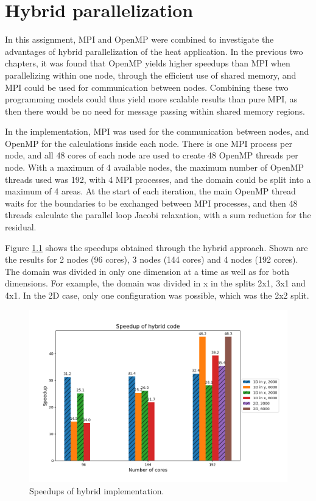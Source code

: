 \chapter{Hybrid parallelization}


In this assignment, MPI and OpenMP were combined to investigate the advantages of hybrid parallelization of the heat application. In the previous two chapters, it was found that OpenMP yields higher speedups than MPI when parallelizing within one node, through the efficient use of shared memory, and MPI could be used for communication between nodes. Combining these two programming models could thus yield more scalable results than pure MPI, as then there would be no need for message passing within shared memory regions.

In the implementation, MPI was used for the communication between nodes, and OpenMP for the calculations inside each node. There is one MPI process per node, and all 48 cores of each node are used to create 48 OpenMP threads per node. With a maximum of 4 available nodes, the maximum number of OpenMP threads used was 192, with 4 MPI processes, and the domain could be split into a maximum of 4 areas. At the start of each iteration, the main OpenMP thread waits for the boundaries to be exchanged between MPI processes, and then 48 threads calculate the parallel loop Jacobi relaxation, with a sum reduction for the residual.

Figure \ref{fig:hybrid_speedup} shows the speedups obtained through the hybrid approach. Shown are the results for 2 nodes (96 cores), 3 nodes (144 cores) and 4 nodes (192 cores). The domain was divided in only one dimension at a time as well as for both dimensions. For example, the domain was divided in x in the splits 2x1, 3x1 and 4x1. In the 2D case, only one configuration was possible, which was the 2x2 split.

\begin{figure}[h]
    \centering
    \includegraphics[scale=0.6]{figures/hybrid_speedup.png}
    \caption{Speedups of hybrid implementation.}
    \label{fig:hybrid_speedup}
\end{figure}

